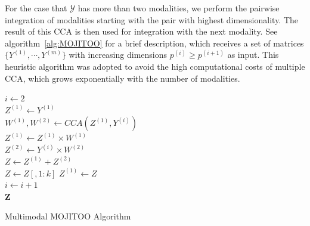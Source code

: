 For the case that $\mathcal{Y}$ has more than two modalities, we perform the pairwise integration of modalities starting with the pair with highest dimensionality. The result of this CCA is then used for integration with the next modality. See algorithm~\ref{alg:MOJITOO} for a brief description, which receives a set of matrices $\{Y^{(1)},\cdots, Y^{(m)}\}$ with increasing dimensions $p^{(i)}\geq p^{(i+1)}$ as input. This heuristic algorithm was adopted to avoid the high computational costs of multiple CCA, which grows exponentially with the number of modalities. 
\begin{algorithm}

	$i \gets 2$ \\
	$Z^{(1)} \gets Y^{(1)}$ \\
	{
		$W^{(1)}, W^{(2)} \gets CCA(Z^{(1)}, Y^{(i)})$ \\ 
		$Z^{(1)} \gets Z^{(1)}\times W^{(1)}$ \\ 
		$Z^{(2)} \gets Y^{(i)}\times W^{(2)}$  \\
		$Z \gets Z^{(1)} + Z^{(2)}$ \\ 
		$Z \gets Z[, 1:k]$ 
		$Z^{(1)} \gets Z$ \\
		$i \gets i+1$  \\
	}
	\Return $\mathbf{Z}$ 
	\caption{Multimodal MOJITOO Algorithm }
	\label{alg:MOJITOO}
\end{algorithm}

